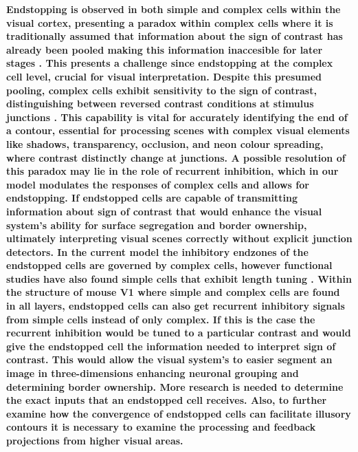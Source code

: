 \documentclass[12pt]{article}
\begin{document}
\textbf{ Endstopping is observed in both simple and complex cells within the visual cortex, presenting a paradox within complex cells where it is traditionally assumed that information about the sign of contrast has already been pooled making this information inaccesible for later stages \autocite{yazdanbakhshEndStoppingV12006}. This presents a challenge since endstopping at the complex cell level, crucial for visual interpretation. Despite this presumed pooling, complex cells exhibit sensitivity to the sign of contrast, distinguishing between reversed contrast conditions at stimulus junctions \autocite{yazdanbakhshEndStoppingV12006}. This capability is vital for accurately identifying the end of a contour, essential for processing scenes with complex visual elements like shadows, transparency, occlusion, and neon colour spreading, where contrast distinctly change at junctions. A possible resolution of this paradox may lie in the role of recurrent inhibition, which in our model modulates the responses of complex cells and allows for endstopping. If endstopped cells are capable of transmitting information about sign of contrast that would enhance the visual system's ability for surface segregation and border ownership, ultimately interpreting visual scenes correctly without explicit junction detectors. In the current model the inhibitory endzones of the endstopped cells are governed by complex cells, however functional studies have also found simple cells that exhibit length tuning \autocite{andersonMembranePotentialConductance2001}. Within the structure of mouse V1 where simple and complex cells are found in all layers, endstopped cells can also get recurrent inhibitory signals from simple cells instead of only complex. If this is the case the recurrent inhibition would be tuned to a particular contrast and would give the endstopped cell the information needed to interpret sign of contrast. This would allow the visual system's to easier segment an image in three-dimensions enhancing neuronal grouping and determining border ownership. More research is needed to determine the exact inputs that an endstopped cell receives. Also, to further examine how the convergence of endstopped cells can facilitate illusory contours it is necessary to examine the processing and feedback projections from higher visual areas.}
\end{document}
